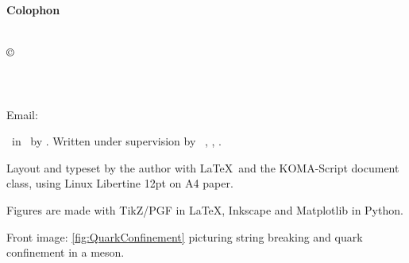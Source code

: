 \documentclass[../main.tex]{subfiles} %
\begin{document}
\clearpage %

\thispagestyle{empty} %


\vspace*{\fill} %

\begin{center} %
    \textbf{\textsf{Colophon}} %
\end{center}
\vspace{1em} %

\noindent %
\textsl{\Title}\\

\noindent
$\copyright$ \Year\ \Author\\
\Department\\
\University\\
\DepartmentAddress\\
Email: \AuthorEmail \vspace{1.5em} %



\noindent %
\Doctype\ in \MakeLowercase{\SubjectOfStudy}\ by \Author. Written under supervision by \SupervisorTitle\ \Supervisor, \Department, \University.
\vspace{.5em} %

\noindent %
Layout and typeset by the author with \LaTeX\, and the KOMA-Script document class, using Linux Libertine 12pt on A4 paper.
\vspace{.5em} %

\noindent %
Figures are made with TikZ/PGF in \LaTeX, Inkscape and Matplotlib in Python.
\vspace{.5em} %

\noindent
Front image: \cref{fig:QuarkConfinement} picturing string breaking and quark confinement in a meson.
%


\end{document}
